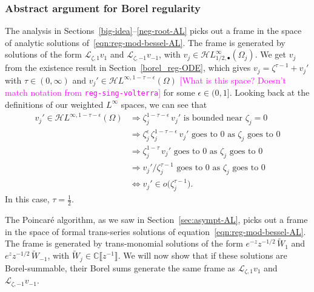 \documentclass{article}
\newcommand{\singexp}[2]{\mathcal{H}L^\infty_{#1, #2}}
\newcommand{\singexpalg}[1]{\singexp{#1}{\bullet}}
\newcommand{\holoL}[1]{\mathcal{H}L^{#1}} %
\newcommand{\C}{\mathbb{C}}
\newcommand{\laplace}{\mathcal{L}}
\theoremstyle{definition}
\theoremstyle{plain}
\newenvironment{verify}{\color{ForestGreen}}{\color{black}}
\begin{document}
\subsubsection{Abstract argument for Borel regularity}\label{bessel-regularity-AL}
The analysis in Sections~\ref{big-idea}--\ref{neg-root-AL} picks out a frame in the space of analytic solutions of~\eqref{eqn:reg-mod-bessel-AL}. The frame is generated by solutions of the form $\laplace_{\zeta, 1} v_1$ and $\laplace_{\zeta, -1} v_{-1}$, with $v_j\in\singexpalg{1/2}(\Omega_j)$.
\begin{verify}
We get $v_j$ from the existence result in Section~\ref{borel_reg-ODE}, which gives $v_j = \zeta^{\tau-1} + v_j'$ with $\tau \in (0, \infty)$ and $v_j' \in \holoL{\infty, 1-\tau-\epsilon}(\Omega)$ \textcolor{magenta}{[What is this space? Doesn't match notation from {\tt reg-sing-volterra}]} for some $\epsilon \in (0, 1]$. Looking back at the definitions of our weighted $L^\infty$ spaces, we can see that
\begin{align*}
v_j' \in \holoL{\infty, 1-\tau-\epsilon}(\Omega) & \Longrightarrow \zeta_j^{1-\tau-\epsilon}\,v_j' \text{ is bounded near } \zeta_j = 0 \\
& \Longrightarrow \zeta_j^\epsilon\,\zeta_j^{1-\tau-\epsilon}\,v_j' \text{ goes to } 0 \text{ as } \zeta_j \text{ goes to } 0 \\
& \Longrightarrow \zeta_j^{1-\tau}\,v_j' \text{ goes to } 0 \text{ as } \zeta_j \text{ goes to } 0 \\
& \Longrightarrow v_j' / \zeta_j^{\tau-1} \text{ goes to } 0 \text{ as } \zeta_j \text{ goes to } 0 \\
& \Longleftrightarrow v_j' \in o\big(\zeta_j^{\tau-1}\big).
\end{align*}
In this case, $\tau = \tfrac{1}{2}$.
\end{verify}

The Poincar\'{e} algorithm, as we saw in Section~\ref{sec:asympt-AL}, picks out a frame in the space of formal trans-series solutions of equation~\eqref{eqn:reg-mod-bessel-AL}. The frame is generated by trans-monomial solutions of the form $e^{-z} z^{-1/2}\,\tilde{W}_1$ and $e^z z^{-1/2}\,\tilde{W}_{-1}$, with $\tilde{W}_j \in \C\llbracket z^{-1} \rrbracket$. We will now show that if these solutions are Borel-summable, their Borel sums generate the same frame as $\laplace_{\zeta, 1} v_1$ and $\laplace_{\zeta, -1} v_{-1}$.
\end{document}

